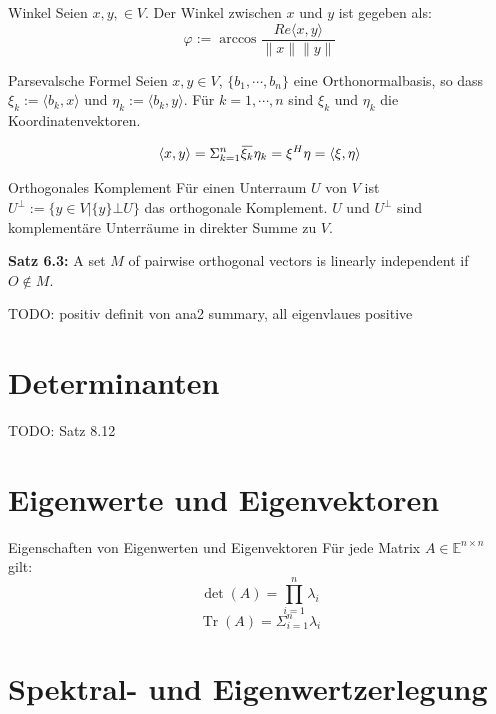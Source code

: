 \documentclass[a4paper,10pt]{article}
\DeclareMathOperator{\Tr}{Tr}
\newcommand{\overbar}[1]{\mkern 1.5mu\overline{\mkern-1.5mu#1\mkern-1.5mu}\mkern 1.5mu}
\begin{document}
\begin{subbox}{Winkel}
  Seien $x, y, \in V$. Der Winkel zwischen $x$ und $y$ ist gegeben als:
  $$\varphi := \arccos \frac{Re \langle x, y \rangle}{\lVert x \rVert \lVert y \rVert}$$
\end{subbox}

\begin{mainbox}{Parsevalsche Formel}
  Seien $x, y \in V$, $\{ b_1, \cdots, b_n \}$ eine Orthonormalbasis, so dass $\xi_k := \langle b_k, x \rangle$ und $\eta_k := \langle b_k, y \rangle$. Für $k = 1, \cdots, n$ sind $\xi_k$ und $\eta_k$ die Koordinatenvektoren. 

  $$\langle x, y \rangle = \Sigma_{k=1}^n \overbar{\xi_k} \eta_k = \xi^H \eta = \langle \xi, \eta \rangle$$

\end{mainbox}

\begin{subbox}{Orthogonales Komplement}
  Für einen Unterraum $U$ von $V$ ist $U^\bot := \{ y \in V | \{y\} \bot U \}$ das orthogonale Komplement. $U$ und $U^\bot$ sind komplementäre Unterräume in direkter Summe zu $V$.
\end{subbox}

\textbf{Satz 6.3:} A set $M$ of pairwise orthogonal vectors is linearly independent if $O \notin M$.

TODO: positiv definit von ana2 summary, all eigenvlaues positive

\section{Determinanten}

TODO: Satz 8.12

\section{Eigenwerte und Eigenvektoren}

\begin{subbox}{Eigenschaften von Eigenwerten und Eigenvektoren}
  Für jede Matrix $A \in \mathbb{E}^{n \times n}$ gilt:
  $$\det(A) = \prod_{i=1}^{n} \lambda_i$$
  $$\Tr(A) = \Sigma_{i=1}^n \lambda_i$$
\end{subbox}

\section{Spektral- und Eigenwertzerlegung}
\end{document}
